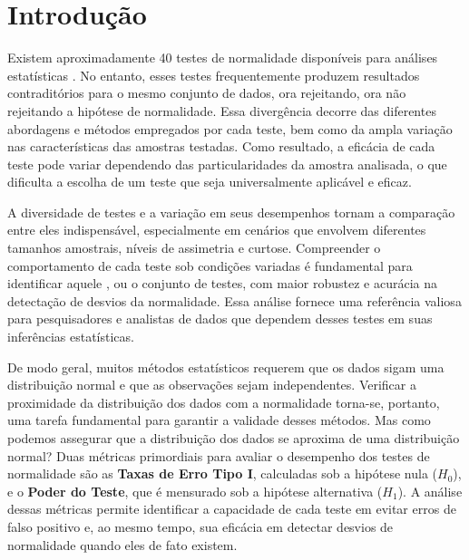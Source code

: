 \documentclass[a4paper,11pt]{article} %
\begin{document}
\section{Introdução} %

Existem aproximadamente 40 testes de normalidade disponíveis para análises estatísticas \cite{dufour1998simulation}. No entanto, esses testes frequentemente produzem resultados contraditórios para o mesmo conjunto de dados, ora rejeitando, ora não rejeitando a hipótese de normalidade. Essa divergência decorre das diferentes abordagens e métodos empregados por cada teste, bem como da ampla variação nas características das amostras testadas. Como resultado, a eficácia de cada teste pode variar dependendo das particularidades da amostra analisada, o que dificulta a escolha de um teste que seja  universalmente aplicável e eficaz.

\vspace{0.5cm}

A diversidade de testes e a variação em seus desempenhos tornam a comparação entre eles indispensável, especialmente em cenários que envolvem diferentes tamanhos amostrais, níveis de assimetria e curtose. Compreender o comportamento de cada teste sob condições variadas é fundamental para identificar aquele , ou o conjunto de testes, com maior robustez e acurácia na detectação de desvios da normalidade. Essa análise fornece uma referência valiosa para pesquisadores e analistas de dados que dependem desses testes em suas inferências estatísticas.

\vspace{0.5cm}

De modo geral, muitos métodos estatísticos requerem que os dados sigam uma distribuição normal e que as observações sejam independentes. Verificar a proximidade da distribuição dos dados com a normalidade torna-se, portanto, uma tarefa fundamental para garantir a validade desses métodos. Mas como podemos assegurar que a distribuição dos dados se aproxima de uma distribuição normal? Duas métricas primordiais para avaliar o desempenho dos testes de normalidade são as \textbf{Taxas de Erro Tipo I}, calculadas sob a hipótese nula ($H_0$), e o \textbf{Poder do Teste}, que é mensurado sob a hipótese alternativa ($H_1$). A análise dessas métricas permite identificar a capacidade de cada teste em evitar erros de falso positivo e, ao mesmo tempo, sua eficácia em detectar desvios de normalidade quando eles de fato existem.

\vspace{0.5cm}
\end{document}

